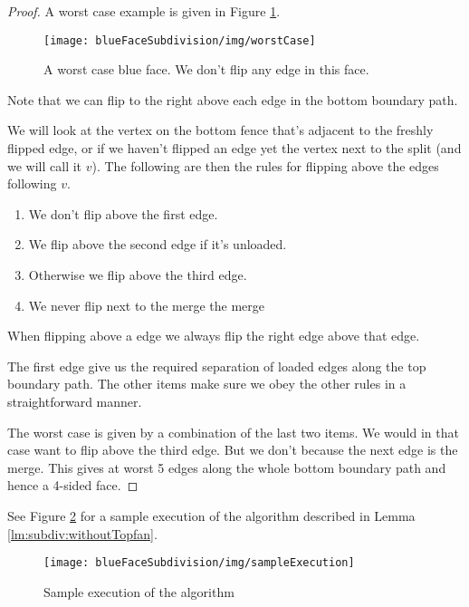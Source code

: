 \begin{proof}
  A worst case example is given in Figure \ref{fig:subdiv:worstCase}.

  \begin{figure}[h]
    \centering
    \texttt{[image: blueFaceSubdivision/img/worstCase]}
    \caption{A worst case blue face. We don't flip any edge in this face.}
    \label{fig:subdiv:worstCase}
  \end{figure}

  Note that we can flip to the right above each edge in the bottom boundary path.

  We will look at the vertex on the bottom fence that's adjacent to the freshly flipped edge, or if we haven't flipped an edge yet the vertex next to the split (and we will call it $v$). The following are then the rules for flipping above the edges following $v$.
  \begin{enumerate}
    \item We don't flip above the first edge.
    \item We flip above the second edge if it's unloaded.
    \item Otherwise we flip above the third edge.
    \item We never flip next to the merge the merge
  \end{enumerate}

  When flipping above a edge we always flip the right edge above that edge.

  The first edge give us the required separation of loaded edges along the top boundary path. The other items make sure we obey the other rules in a straightforward manner.

  The worst case is given by a combination of the last two items. We would in that case want to flip above the third edge. But we don't because the next edge is the merge. This gives at worst 5 edges along the whole bottom boundary path and hence a 4-sided face.



\end{proof}

See Figure \ref{fig:subdiv:sampleExecution} for a sample execution of the algorithm described in Lemma \ref{lm:subdiv:withoutTopfan}.

\begin{figure}[h]
  \centering
  \texttt{[image: blueFaceSubdivision/img/sampleExecution]}
  \caption{Sample execution of the algorithm}
  \label{fig:subdiv:sampleExecution}
\end{figure}


